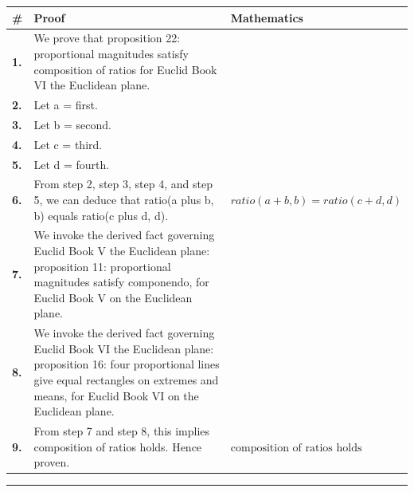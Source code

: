 \documentclass[11pt]{article}
\theoremstyle{definition}
\begin{document}
\begin{tabular}{@{} >{\raggedright\arraybackslash}p{} >{\raggedright\arraybackslash}p{} >{\raggedleft\arraybackslash}p{} @{}}
\textbf{\#} & \textbf{Proof} & \textbf{Mathematics} \\
\midrule
\textbf{1.} & We prove that proposition 22: proportional magnitudes satisfy composition of ratios for Euclid Book VI the Euclidean plane. & \\[0.45em]
\textbf{2.} & Let a = first. & \\[0.45em]
\textbf{3.} & Let b = second. & \\[0.45em]
\textbf{4.} & Let c = third. & \\[0.45em]
\textbf{5.} & Let d = fourth. & \\[0.45em]
\textbf{6.} & From step 2, step 3, step 4, and step 5, we can deduce that ratio(a plus b, b) equals ratio(c plus d, d). & $\displaystyle ratio(a + b, b) = ratio(c + d, d)$ \\[0.45em]
\textbf{7.} & We invoke the derived fact governing Euclid Book V the Euclidean plane: proposition 11: proportional magnitudes satisfy componendo, for Euclid Book V on the Euclidean plane. & \\[0.45em]
\textbf{8.} & We invoke the derived fact governing Euclid Book VI the Euclidean plane: proposition 16: four proportional lines give equal rectangles on extremes and means, for Euclid Book VI on the Euclidean plane. & \\[0.45em]
\textbf{9.} & From step 7 and step 8, this implies composition of ratios holds. Hence proven. & $\displaystyle \text{composition of ratios holds}$ \\[0.45em]
\bottomrule
\end{tabular}
\label{thm:Geometry-Euclid Book VI-proposition_22_proportional_magnitudes_satisfy_composition_of_ratios}
\par\medskip\hrule
\end{document}
